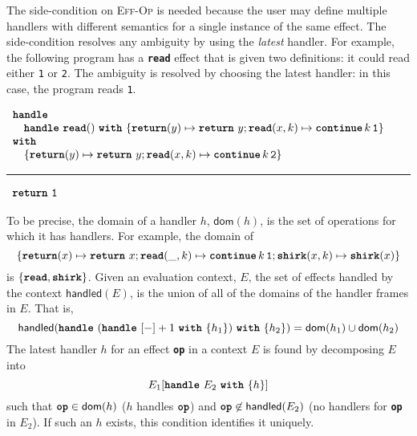 The side-condition on \textsc{Eff-Op} is needed because the user may define multiple handlers with different semantics for a single instance of the same effect. The side-condition resolves any ambiguity by using the \textit{latest} handler. For example, the following program has a \textbf{\texttt{read}} effect that is given two definitions: it could read either \texttt{1} or \texttt{2}. The ambiguity is resolved by choosing the latest handler: in this case, the program reads \texttt{1}.
\begin{eff}
$\begin{array}{l}
  \textbf{\texttt{handle}} \\
  \quad \textbf{\texttt{handle}} \,\, {\textbf{\texttt{read}}()} \,\, \textbf{\texttt{with}} \,\, \{{\textbf{\texttt{return}}(y) \mapsto \texttt{\textbf{return}} \,\, {y}; \textbf{\texttt{read}}(x, k) \mapsto {\textbf{\texttt{continue}} \, {k} \, {\texttt{1}}}}\} \\
  \textbf{\texttt{with}} \\ 
  \quad \{ \textbf{\texttt{return}}(y) \mapsto \texttt{\textbf{return}} \,\, {y}; \textbf{\texttt{read}}(x, k) \mapsto {\textbf{\texttt{continue}} \, {k} \, {\texttt{2}}} \}
\end{array}$ 

\vspace{2mm} 
\textcolor{effComment}{\hrule height 0.2mm \relax}
\vspace{2mm} 

\textcolor{effComment}{$\begin{array}{l}\texttt{\textbf{return}} \,\, {\texttt{1}}\end{array}$}
\end{eff}

To be precise, the domain of a handler $h$, $\textsf{dom}(h)$, is the set of operations for which it has handlers. For example, the domain of 
\[\{ \textbf{\texttt{return}}(x) \mapsto \texttt{\textbf{return}} \,\, {x}; \textbf{\texttt{read}}(\_, k) \mapsto \textbf{\texttt{continue}} \, {k} \, {\texttt{1}}; \textbf{\texttt{shirk}}(x, k) \mapsto \textbf{\texttt{shirk}}(x)
\} \] 
is $\{ \textbf{\texttt{read}}, \textbf{\texttt{shirk}} \}$.
Given an evaluation context, $E$, the set of effects handled by the context $\textsf{handled}(E)$, is the union of all of the domains of the handler frames in $E$. That is, 
\[\textsf{handled}(\textbf{\texttt{handle}} \,\, {(\textbf{\texttt{handle}} \,\, {[-]+1} \,\, \textbf{\texttt{with}} \,\, \{{h_1}\})} \,\, \textbf{\texttt{with}} \,\, \{{h_2}\}) = \textsf{dom}(h_1) \cup \textsf{dom}(h_2)\]
The latest handler $h$ for an effect \textbf{\texttt{op}} in a context $E$ is found by decomposing $E$ into 
\[E_1[\textbf{\texttt{handle}} \,\, {E_2} \,\, \textbf{\texttt{with}} \,\, \{{h}\}]\]
such that $\textbf{\texttt{op}} \in \textsf{dom}(h)$ ($h$ handles $\textbf{\texttt{op}}$) and $\textbf{\texttt{op}} \not\in \textsf{handled}(E_2)$ (no handlers for \textbf{\texttt{op}} in $E_2$). If such an $h$ exists, this condition identifies it uniquely. 
